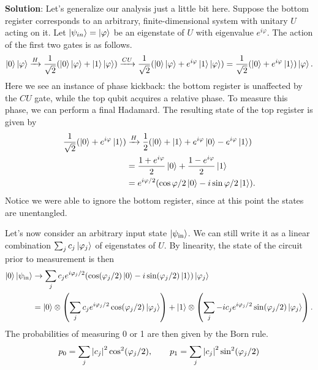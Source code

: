 \documentclass{book}
\begin{document}
    \textbf{Solution}: Let's generalize our analysis just a little bit here. Suppose the bottom register corresponds to an arbitrary, finite-dimensional system with unitary $U$ acting on it. Let $\ket{\psi_{in}} = \ket{\varphi}$ be an eigenstate of $U$ with eigenvalue $e^{i\varphi}$. The action of the first two gates is as follows.
    \begin{align}
        \ket{0}\ket{\varphi} \xrightarrow{H} \frac{1}{\sqrt{2}}(\ket{0}\ket{\varphi} + \ket{1}\ket{\varphi}) \xrightarrow{CU} \frac{1}{\sqrt{2}}(\ket{0}\ket{\varphi} + e^{i\varphi}\ket{1}\ket{\varphi}) = \frac{1}{\sqrt{2}}(\ket{0} + e^{i\varphi}\ket{1})\ket{\varphi}.
    \end{align}
    Here we see an instance of phase kickback: the bottom register is unaffected by the $CU$ gate, while the top qubit acquires a relative phase. To measure this phase, we can perform a final Hadamard. The resulting state of the top register is given by
    \begin{align} \label{eq:4.34_prior2meas}
    \begin{aligned}
        \frac{1}{\sqrt{2}}(\ket{0} + e^{i\varphi}\ket{1}) &\xrightarrow{H} \frac{1}{2}(\ket{0} + \ket{1} + e^{i\varphi}\ket{0} - e^{i\varphi}\ket{1}) \\
        &= \frac{1 + e^{i\varphi}}{2} \ket{0} + \frac{1 - e^{i\varphi}}{2} \ket{1} \\
        &= e^{i \varphi/2} (\cos \varphi/2 \ket{0} - i \sin\varphi/2 \ket{1}).
    \end{aligned}
    \end{align}
    Notice we were able to ignore the bottom register, since at this point the states are unentangled. 

    Let's now consider an arbitrary input state $\ket{\psi_\text{in}}$. We can still write it as a linear combination $\sum_j c_j \ket{\varphi_j}$ of eigenstates of $U$. By linearity, the state of the circuit prior to measurement is then
    \begin{align}
    \begin{aligned}
        \ket{0}\ket{\psi_\text{in}} &\rightarrow \sum_j c_j e^{i\varphi_j/2}(\cos (\varphi_j/2) \ket{0} - i \sin(\varphi_j/2) \ket{1})\ket{\varphi_j} \\
        &=\ket{0} \otimes \left(\sum_j c_j e^{i\varphi_j/2} \cos (\varphi_j/2) \ket{\varphi_j}\right) + \ket{1} \otimes \left(\sum_j -i c_j e^{i\varphi_j/2} \sin (\varphi_j/2) \ket{\varphi_j}\right).
    \end{aligned}
    \end{align}
    The probabilities of measuring 0 or 1 are then given by the Born rule.
    \begin{align} \label{eq:4.34_measprobs}
        p_0 = \sum_j \abs{c_j}^2 \cos^2(\varphi_j/2), \qquad p_1 = \sum_j \abs{c_j}^2 \sin^2(\varphi_j/2)
    \end{align}
\end{document}
